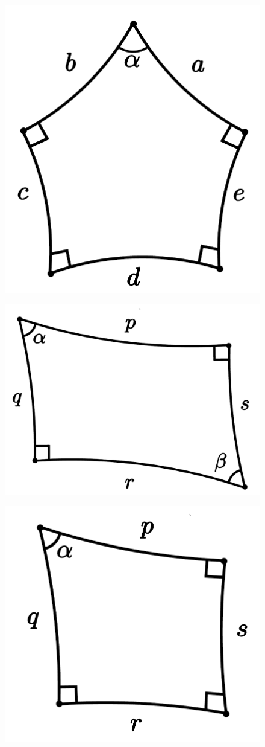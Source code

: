 \begin{figure}[h]
	\centering
	\begin{minipage}{.5\textwidth}
		\centering
		\includegraphics[width=0.7\linewidth]{Appendix1/pentagon.pdf}
		\label{fig:test1}
	\end{minipage}%
	\begin{minipage}{.5\textwidth}
		\centering
		\includegraphics[width=0.7\linewidth]{Appendix1/quadrilateral.pdf}
		\label{fig:test2}
	\end{minipage}
	\begin{minipage}{.5\textwidth}
		\centering
		\includegraphics[width=0.7\linewidth]{Appendix1/trirectangle.pdf}

\end{minipage}
\end{figure}
